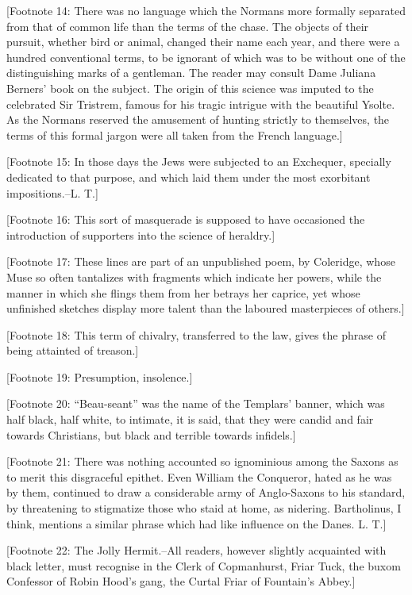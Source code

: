 {[}Footnote 14: There was no language which the Normans more formally
separated from that of common life than the terms of the chase. The
objects of their pursuit, whether bird or animal, changed their name
each year, and there were a hundred conventional terms, to be ignorant
of which was to be without one of the distinguishing marks of a
gentleman. The reader may consult Dame Juliana Berners' book on the
subject. The origin of this science was imputed to the celebrated Sir
Tristrem, famous for his tragic intrigue with the beautiful Ysolte. As
the Normans reserved the amusement of hunting strictly to themselves,
the terms of this formal jargon were all taken from the French
language.{]}

{[}Footnote 15: In those days the Jews were subjected to an Exchequer,
specially dedicated to that purpose, and which laid them under the most
exorbitant impositions.--L. T.{]}

{[}Footnote 16: This sort of masquerade is supposed to have occasioned
the introduction of supporters into the science of heraldry.{]}

{[}Footnote 17: These lines are part of an unpublished poem, by
Coleridge, whose Muse so often tantalizes with fragments which indicate
her powers, while the manner in which she flings them from her betrays
her caprice, yet whose unfinished sketches display more talent than the
laboured masterpieces of others.{]}

{[}Footnote 18: This term of chivalry, transferred to the law, gives the
phrase of being attainted of treason.{]}

{[}Footnote 19: Presumption, insolence.{]}

{[}Footnote 20: ``Beau-seant'' was the name of the Templars' banner,
which was half black, half white, to intimate, it is said, that they
were candid and fair towards Christians, but black and terrible towards
infidels.{]}

{[}Footnote 21: There was nothing accounted so ignominious among the
Saxons as to merit this disgraceful epithet. Even William the Conqueror,
hated as he was by them, continued to draw a considerable army of
Anglo-Saxons to his standard, by threatening to stigmatize those who
staid at home, as nidering. Bartholinus, I think, mentions a similar
phrase which had like influence on the Danes. L. T.{]}

{[}Footnote 22: The Jolly Hermit.--All readers, however slightly
acquainted with black letter, must recognise in the Clerk of
Copmanhurst, Friar Tuck, the buxom Confessor of Robin Hood's gang, the
Curtal Friar of Fountain's Abbey.{]}

